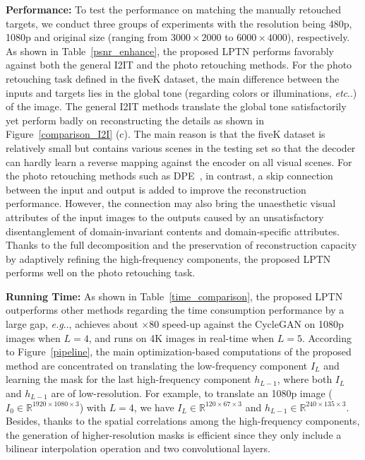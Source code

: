 \documentclass[10pt,twocolumn,letterpaper]{article}
\makeatletter
\DeclareRobustCommand\onedot{\futurelet\@let@token\@onedot}
\def\@onedot{\ifx\@let@token.\else.\null\fi\xspace}
\def\eg{\emph{e.g}\onedot} \def\Eg{\emph{E.g}\onedot}
\def\etc{\emph{etc}\onedot} \def\vs{\emph{vs}\onedot}
\makeatother
\begin{document}
	
	\noindent\textbf{Performance: }
	To test the performance on matching the manually retouched targets, we conduct three groups of experiments with the resolution being 480p, 1080p and original size (ranging from $ 3000\times 2000 $ to $ 6000\times 4000 $), respectively. As shown in Table~\ref{psnr_enhance}, the proposed LPTN performs favorably against both the general I2IT and the photo retouching methods. For the photo retouching task defined in the fiveK dataset, the main difference between the inputs and targets lies in the global tone (regarding colors or illuminations, \etc) of the image. The general I2IT methods translate the global tone satisfactorily yet perform badly on reconstructing the details as shown in Figure~\ref{comparison_I2I} (c). The main reason is that the fiveK dataset is relatively small but contains various scenes in the testing set so that the decoder can hardly learn a reverse mapping against the encoder on all visual scenes. For the photo retouching methods such as DPE~\cite{chen2018deep}, in contrast, a skip connection between the input and output is added to improve the reconstruction performance. However, the connection may also bring the unaesthetic visual attributes of the input images to the outputs caused by an unsatisfactory disentanglement of domain-invariant contents and domain-specific attributes. Thanks to the full decomposition and the preservation of reconstruction capacity by adaptively refining the high-frequency components, the proposed LPTN performs well on the photo retouching task.
	
	\noindent\textbf{Running Time: } As shown in Table~\ref{time_comparison}, the proposed LPTN outperforms other methods regarding the time consumption performance by a large gap, \eg, achieves about $\times 80$ speed-up against the CycleGAN on 1080p images when $ L=4 $, and runs on 4K images in real-time when $L=5$. According to Figure~\ref{pipeline}, the main optimization-based computations of the proposed method are concentrated on translating the low-frequency component $I_L$ and learning the mask for the last high-frequency component $h_{L-1}$, where both $I_L$ and $h_{L-1}$ are of low-resolution. For example, to translate an 1080p image ($I_0\in\mathbb{R}^{1920\times 1080\times 3}$) with $L=4$, we have $I_L\in\mathbb{R}^{120\times 67\times 3}$ and $h_{L-1}\in\mathbb{R}^{240\times 135\times 3}$. Besides, thanks to the spatial correlations among the high-frequency components, the generation of higher-resolution masks is efficient since they only include a bilinear interpolation operation and two convolutional layers.
\end{document}
